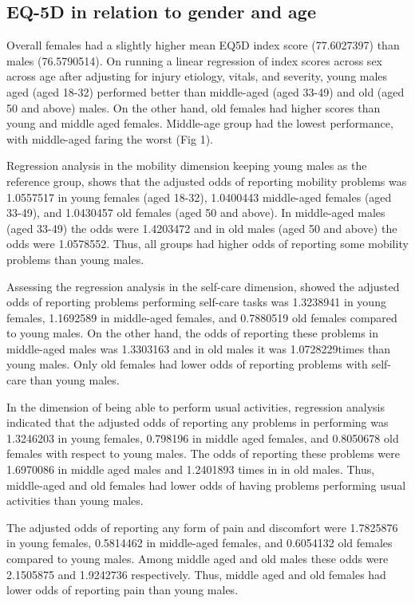 \documentclass[
]{article}
\begin{document}
\hypertarget{eq-5d-in-relation-to-gender-and-age}{%
\subsection{EQ-5D in relation to gender and
age}\label{eq-5d-in-relation-to-gender-and-age}}

Overall females had a slightly higher mean EQ5D index score (77.6027397)
than males (76.5790514). On running a linear regression of index scores
across sex across age after adjusting for injury etiology, vitals, and
severity, young males aged (aged 18-32) performed better than
middle-aged (aged 33-49) and old (aged 50 and above) males. On the other
hand, old females had higher scores than young and middle aged females.
Middle-age group had the lowest performance, with middle-aged faring the
worst (Fig 1).

Regression analysis in the mobility dimension keeping young males as the
reference group, shows that the adjusted odds of reporting mobility
problems was 1.0557517 in young females (aged 18-32), 1.0400443
middle-aged females (aged 33-49), and 1.0430457 old females (aged 50 and
above). In middle-aged males (aged 33-49) the odds were 1.4203472 and in
old males (aged 50 and above) the odds were 1.0578552. Thus, all groups
had higher odds of reporting some mobility problems than young males.

Assessing the regression analysis in the self-care dimension, showed the
adjusted odds of reporting problems performing self-care tasks was
1.3238941 in young females, 1.1692589 in middle-aged females, and
0.7880519 old females compared to young males. On the other hand, the
odds of reporting these problems in middle-aged males was 1.3303163 and
in old males it was 1.0728229times than young males. Only old females
had lower odds of reporting problems with self-care than young males.

In the dimension of being able to perform usual activities, regression
analysis indicated that the adjusted odds of reporting any problems in
performing was 1.3246203 in young females, 0.798196 in middle aged
females, and 0.8050678 old females with respect to young males. The odds
of reporting these problems were 1.6970086 in middle aged males and
1.2401893 times in in old males. Thus, middle-aged and old females had
lower odds of having problems performing usual activities than young
males.

The adjusted odds of reporting any form of pain and discomfort were
1.7825876 in young females, 0.5814462 in middle-aged females, and
0.6054132 old females compared to young males. Among middle aged and old
males these odds were 2.1505875 and 1.9242736 respectively. Thus, middle
aged and old females had lower odds of reporting pain than young males.
\end{document}
